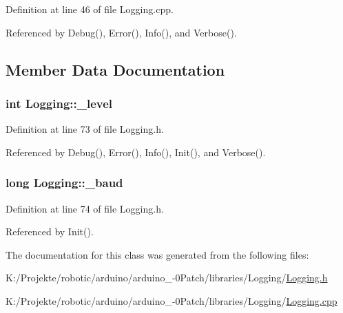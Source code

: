 Definition at line 46 of file Logging.cpp.

Referenced by Debug(), Error(), Info(), and Verbose().

\subsection{Member Data Documentation}
\hypertarget{class_logging_117105f639285ba5922836121294c04a}{
\subsubsection[\_\-level]{\setlength{\rightskip}{0pt plus 5cm}int {\bf Logging::\_\-level}}}
\label{class_logging_117105f639285ba5922836121294c04a}




Definition at line 73 of file Logging.h.

Referenced by Debug(), Error(), Info(), Init(), and Verbose().\hypertarget{class_logging_8a2fe833b6e957b763146c32d6be5f2d}{
\subsubsection[\_\-baud]{\setlength{\rightskip}{0pt plus 5cm}long {\bf Logging::\_\-baud}}}
\label{class_logging_8a2fe833b6e957b763146c32d6be5f2d}




Definition at line 74 of file Logging.h.

Referenced by Init().

The documentation for this class was generated from the following files:\begin{CompactItemize}
\item 
K:/Projekte/robotic/arduino/arduino\_-0Patch/libraries/Logging/\hyperlink{_logging_8h}{Logging.h}\item 
K:/Projekte/robotic/arduino/arduino\_-0Patch/libraries/Logging/\hyperlink{_logging_8cpp}{Logging.cpp}\end{CompactItemize}
